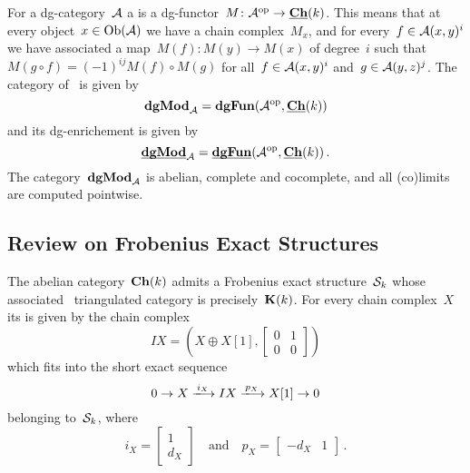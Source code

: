 \documentclass[a4paper,10pt]{scrartcl}
\begin{document}
For a dg-category~$\Acat$ a  is a dg-functor~$M \colon \mathcal{A}^{{\mathrm{op}}} \to \underline{\mathbf{Ch}}(k)$.
This means that at every object~$x \in \operatorname{Ob}(\mathcal{A})$ we have a chain complex~$M_x$, and for every~$f \in \mathcal{A}(x,y)^i$ we have associated a map~$M(f) \colon M(y) \to M(x)$ of degree~$i$ such that~$M(g \circ f) = (-1)^{ij} M(f) \circ M(g)$ for all~$f \in \mathcal{A}(x,y)^i$ and~$g \in \mathcal{A}(y,z)^j$.
The category of~{\dgmodules{$\Acat$}} is given by
\[
  \mathbf{dgMod}_{\mathcal{A}}
  =
  \mathbf{dgFun}(\mathcal{A}^{{\mathrm{op}}}, \underline{\mathbf{Ch}}(k))
\]
and its dg-enrichement is given by
\[
  \underline{\smash{\mathbf{dgMod}}}_{\mathcal{A}}
  =
  \underline{\smash{\mathbf{dgFun}}}(\mathcal{A}^{{\mathrm{op}}}, \underline{\mathbf{Ch}}(k)) \,.
\]
The category~$\mathbf{dgMod}_{\mathcal{A}}$ is abelian, complete and cocomplete, and all (co)limits are computed pointwise.



\subsection{Review on Frobenius Exact Structures}

The abelian category~$\mathbf{Ch}(k)$ admits a Frobenius exact structure~$\mathcal{S}_k$ whose associated~{} triangulated category is precisely~$\mathbf{K}(k)$.
For every chain complex~$X$ its  is given by the chain complex
\[
  IX
  =
  \left(
    X \oplus X[1],
    \begin{bmatrix}
      0 & 1 \\
      0 & 0
    \end{bmatrix}
  \right)
\]
which fits into the short exact sequence
\begin{equation}
  \label{ses of chain complexes}
  0
  \to
  X
  \xlongto{ i_X }
  IX
  \xlongto{ p_X }
  X[1]
  \to
  0
\end{equation}
belonging to~$\mathcal{S}_k$, where
\[
  i_X
  =
  \begin{bmatrix}
    1 \\
    d_X
  \end{bmatrix}
  \quad\text{and}\quad
  p_X
  =
  \begin{bmatrix}
    -d_X & 1
  \end{bmatrix} \,.
\]
\end{document}
